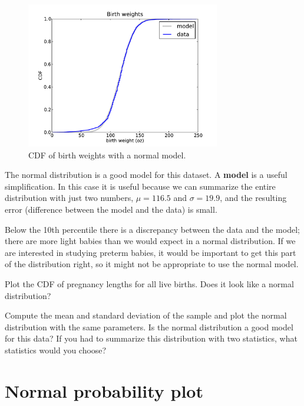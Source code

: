 \documentclass[12pt]{book}
\begin{document}
\begin{figure}
\centerline{\includegraphics[height=2.5in]{figs/nsfg_birthwgt_model.pdf}}
\caption{CDF of birth weights with a normal model.}
\label{nsfg_birthwgt_model}
\end{figure}

The normal distribution is a good model for this dataset.  A {\bf
  model} is a useful simplification.  In this case it is useful
because we can summarize the entire distribution with just two
numbers, $\mu = 116.5$ and $\sigma = 19.9$, and the resulting error
(difference between the model and the data) is small.

Below the 10th percentile there is a discrepancy between the data
and the model; there are more light babies than we would expect in
a normal distribution.  If we are interested in studying preterm
babies, it would be important to get this part of the distribution
right, so it might not be appropriate to use the normal
model.



\begin{exercise}
Plot the CDF of pregnancy lengths for all live births.  Does it
look like a normal distribution?

Compute the mean and standard deviation of the sample and plot the normal
distribution with the same parameters.  Is the normal distribution a
good model for this data?  If you had to summarize this distribution
with two statistics, what statistics would you choose?

\end{exercise}


\section{Normal probability plot}
\end{document}
